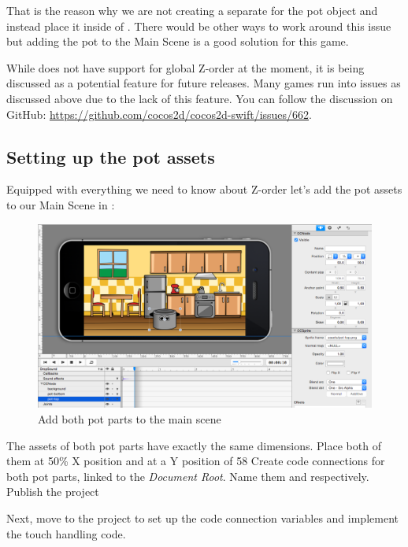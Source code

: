 That is the reason why we are not creating a separate \ccbfile{} for the pot
object and instead place it inside of . There would be
other ways to work around this issue but adding the pot to the Main Scene is a
good solution for this game.

\begin{details}[frametitle={Global Z-order in \cocos{}}] 
While \cocos{} does not have support for global Z-order at the moment, it is
being discussed as a potential feature for future releases. Many games run into
issues as discussed above due to the lack of this feature. You can follow the
discussion on GitHub: \url{https://github.com/cocos2d/cocos2d-swift/issues/662}.
\end{details}

\subsection{Setting up the pot assets}
Equipped with everything we need to know about Z-order let's add the pot assets
to our Main Scene in \SB{}:

\begin{figure}[H]
		\centering
		\includegraphics[width=0.9\linewidth]{images/Chapter3/add_pot.png}
		\caption{Add both pot parts to the main scene}
\end{figure}

\begin{leftbar}
The assets of both pot parts have exactly the same dimensions.
 Place both of them at 50\% X position and at a Y position of 58
Create code connections for both pot parts, linked to the \textit{Document Root}. 
Name them  and  respectively.
Publish the \SB{} project
\end{leftbar}

Next, move to the \xcode{} project to set up the code connection variables and
implement the touch handling code.

